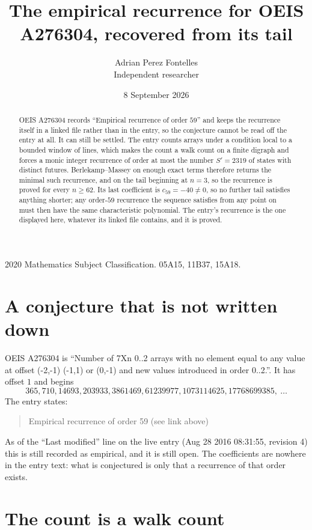 \documentclass[11pt,a4paper]{article}
\title{The empirical recurrence for OEIS A276304, recovered from its tail}
\author{Adrian Perez Fontelles\\ \small Independent researcher}
\date{8 September 2026}
\theoremstyle{plain}
\theoremstyle{definition}
\begin{document}
\maketitle

\begin{abstract}
OEIS A276304 records ``Empirical recurrence of order $59$'' and keeps the recurrence itself in
a linked file rather than in the entry, so the conjecture cannot be read off the entry at all.
It can still be settled. The entry counts arrays under a condition local to a bounded window of
lines, which makes the count a walk count on a finite digraph and forces a monic integer
recurrence of order at most the number $S'=2319$ of states with distinct futures. Berlekamp--Massey on
enough exact terms therefore returns the minimal such recurrence, and on the tail beginning at $n=3$, so the recurrence is proved for every $n\ge62$.
Its last coefficient is $c_{59}=-40\neq0$, so no further tail satisfies anything
shorter; any order-$59$ recurrence the sequence satisfies from any point on must then have
the same characteristic polynomial. The entry's recurrence is the one displayed here, whatever
its linked file contains, and it is proved.
\end{abstract}

\noindent\small 2020 Mathematics Subject Classification. 05A15, 11B37, 15A18.\normalsize

\section{A conjecture that is not written down}

OEIS A276304 is ``Number of 7Xn 0..2 arrays with no element equal to any value at offset (-2,-1) (-1,1) or (0,-1) and new values introduced in order 0..2.''. It has offset $1$ and begins
\[
365, 710, 14693, 203933, 3861469, 61239977, 1073114625, 17768699385,\ \dots
\]
The entry states:
\begin{quote}
Empirical recurrence of order 59 (see link above)
\end{quote}
As of the ``Last modified'' line on the live entry (Aug 28 2016 08:31:55, revision 4)
this is still recorded as empirical, and it is still open. The coefficients are nowhere in the
entry text: what is conjectured is only that a recurrence of that order exists.

\section{The count is a walk count}
\end{document}
